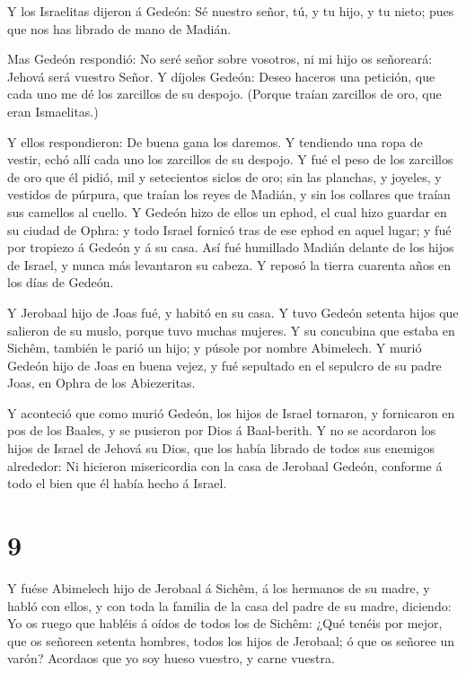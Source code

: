  Y los Israelitas dijeron á Gedeón: Sé nuestro señor, tú, y
tu hijo, y tu nieto; pues que nos has librado de mano de Madián.

 Mas Gedeón respondió: No seré señor sobre vosotros, ni mi
hijo os señoreará: Jehová será vuestro Señor.  Y díjoles
Gedeón: Deseo haceros una petición, que cada uno me dé los zarcillos de
su despojo. (Porque traían zarcillos de oro, que eran Ismaelitas.)

 Y ellos respondieron: De buena gana los daremos. Y
tendiendo una ropa de vestir, echó allí cada uno los zarcillos de su
despojo.  Y fué el peso de los zarcillos de oro que él
pidió, mil y setecientos siclos de oro; sin las planchas, y joyeles, y
vestidos de púrpura, que traían los reyes de Madián, y sin los collares
que traían sus camellos al cuello.  Y Gedeón hizo de ellos
un ephod, el cual hizo guardar en su ciudad de Ophra: y todo Israel
fornicó tras de ese ephod en aquel lugar; y fué por tropiezo á Gedeón y
á su casa.  Así fué humillado Madián delante de los hijos
de Israel, y nunca más levantaron su cabeza. Y reposó la tierra cuarenta
años en los días de Gedeón.

 Y Jerobaal hijo de Joas fué, y habitó en su casa.
 Y tuvo Gedeón setenta hijos que salieron de su muslo,
porque tuvo muchas mujeres.  Y su concubina que estaba en
Sichêm, también le parió un hijo; y púsole por nombre Abimelech.
 Y murió Gedeón hijo de Joas en buena vejez, y fué
sepultado en el sepulcro de su padre Joas, en Ophra de los Abiezeritas.

 Y aconteció que como murió Gedeón, los hijos de Israel
tornaron, y fornicaron en pos de los Baales, y se pusieron por Dios á
Baal-berith.  Y no se acordaron los hijos de Israel de
Jehová su Dios, que los había librado de todos sus enemigos alrededor:
 Ni hicieron misericordia con la casa de Jerobaal Gedeón,
conforme á todo el bien que él había hecho á Israel.

\hypertarget{section-8}{%
\section{9}\label{section-8}}

 Y fuése Abimelech hijo de Jerobaal á Sichêm, á los hermanos
de su madre, y habló con ellos, y con toda la familia de la casa del
padre de su madre, diciendo:  Yo os ruego que habléis á
oídos de todos los de Sichêm: ¿Qué tenéis por mejor, que os señoreen
setenta hombres, todos los hijos de Jerobaal; ó que os señoree un varón?
Acordaos que yo soy hueso vuestro, y carne vuestra.


